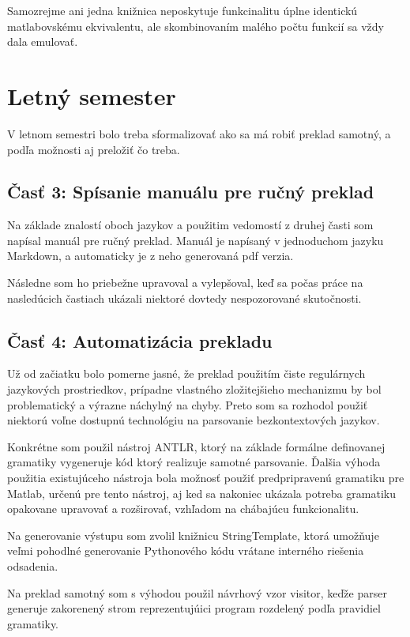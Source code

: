 \documentclass[12pt,a4paper]{article}
\begin{document}
Samozrejme ani jedna knižnica neposkytuje funkcinalitu úplne identickú matlabovskému ekvivalentu, ale skombinovaním malého počtu funkcií sa vždy dala emulovať.

\section*{Letný semester}

V letnom semestri bolo treba sformalizovať ako sa má robiť preklad samotný, a podľa možnosti aj preložiť čo treba.

\subsection*{Časť 3: Spísanie manuálu pre ručný preklad}

Na základe znalostí oboch jazykov a použitim vedomostí z druhej časti som napísal manuál pre ručný preklad.
Manuál je napísaný v jednoduchom jazyku Markdown, a automaticky je z neho generovaná pdf verzia.

Následne som ho priebežne upravoval a vylepšoval, keď sa počas práce na nasledúcich častiach ukázali niektoré dovtedy nespozorované skutočnosti.

\subsection*{Časť 4: Automatizácia prekladu}

Už od začiatku bolo pomerne jasné, že preklad použitím čiste regulárnych jazykových prostriedkov, prípadne vlastného zložitejšieho mechanizmu by bol problematický a výrazne náchylný na chyby.
Preto som sa rozhodol použiť niektorú voľne dostupnú technológiu na parsovanie bezkontextových jazykov.

Konkrétne som použil nástroj ANTLR, ktorý na základe formálne definovanej gramatiky vygeneruje kód ktorý realizuje samotné parsovanie.
Ďalšia výhoda použitia existujúceho nástroja bola možnosť použiť predpripravenú gramatiku pre Matlab, určenú pre tento nástroj, aj ked sa nakoniec ukázala potreba gramatiku opakovane upravovať a rozširovať, vzhľadom na chábajúcu funkcionalitu.

Na generovanie výstupu som zvolil knižnicu StringTemplate, ktorá umožňuje veľmi pohodlné generovanie Pythonového kódu vrátane interného riešenia odsadenia.

Na preklad samotný som s výhodou použil návrhový vzor visitor, keďže parser generuje zakorenený strom reprezentujúici program rozdelený podľa pravidiel gramatiky.
\end{document}

